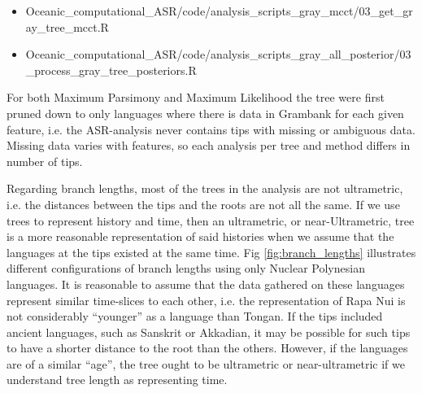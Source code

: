 \documentclass[12pt,letterpaper]{article}
\begin{document}
\begin{itemize}
\item Oceanic\_computational\_ASR/code/analysis\_scripts\_gray\_mcct/03\_get\_gray\_tree\_mcct.R
\item Oceanic\_computational\_ASR/code/analysis\_scripts\_gray\_all\_posterior/03\_process\_gray\_tree\_posteriors.R
\end{itemize}

For both Maximum Parsimony and Maximum Likelihood the tree were first pruned down to only languages where there is data in Grambank for each given feature, i.e. the ASR-analysis never contains tips with missing or ambiguous data. Missing data varies with features, so each analysis per tree and method differs in number of tips.


Regarding branch lengths, most of the trees in the analysis are not ultrametric, i.e. the distances between the tips and the roots are not all the same. If we use trees to represent history and time, then an ultrametric, or near-Ultrametric, tree is a more reasonable representation of said histories when we assume that the languages at the tips existed at the same time. Fig \ref{fig:branch_lengths} illustrates different configurations of branch lengths using only Nuclear Polynesian languages. It is reasonable to assume that the data gathered on these languages represent similar time-slices to each other, i.e. the representation of Rapa Nui is not considerably ``younger'' as a language than Tongan. If the tips included ancient languages, such as Sanskrit or Akkadian, it may be possible for such tips to have a shorter distance to the root than the others. However, if the languages are of a similar ``age'', the tree ought to be ultrametric or near-ultrametric if we understand tree length as representing time.
\end{document}

